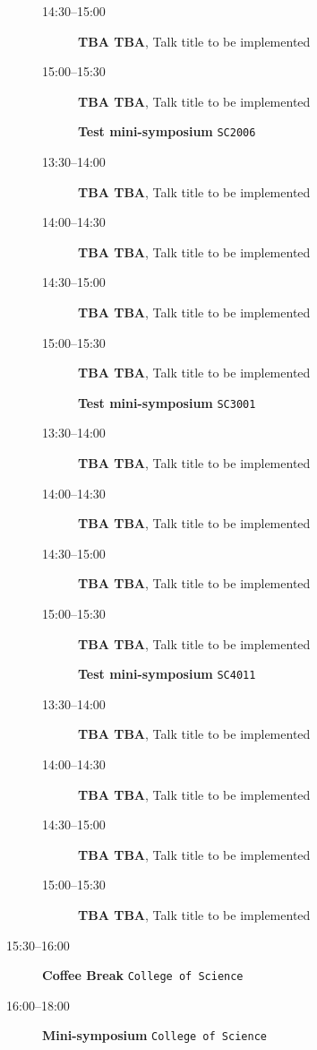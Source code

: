 \documentclass[ILAS2025-program.tex]{subfiles}
\begin{document}
\begin{description}
\begin{description}
        \item[14:30--15:00] \textbf{TBA TBA}, Talk title to be implemented
        \item[15:00--15:30] \textbf{TBA TBA}, Talk title to be implemented
        \end{description}
    \begin{description}
    \item[] \textbf{Test mini-symposium} {\footnotesize\texttt{SC2006}}
    \item[13:30--14:00] \textbf{TBA TBA}, Talk title to be implemented
        \item[14:00--14:30] \textbf{TBA TBA}, Talk title to be implemented
        \item[14:30--15:00] \textbf{TBA TBA}, Talk title to be implemented
        \item[15:00--15:30] \textbf{TBA TBA}, Talk title to be implemented
        \end{description}
    \begin{description}
    \item[] \textbf{Test mini-symposium} {\footnotesize\texttt{SC3001}}
    \item[13:30--14:00] \textbf{TBA TBA}, Talk title to be implemented
        \item[14:00--14:30] \textbf{TBA TBA}, Talk title to be implemented
        \item[14:30--15:00] \textbf{TBA TBA}, Talk title to be implemented
        \item[15:00--15:30] \textbf{TBA TBA}, Talk title to be implemented
        \end{description}
    \begin{description}
    \item[] \textbf{Test mini-symposium} {\footnotesize\texttt{SC4011}}
    \item[13:30--14:00] \textbf{TBA TBA}, Talk title to be implemented
        \item[14:00--14:30] \textbf{TBA TBA}, Talk title to be implemented
        \item[14:30--15:00] \textbf{TBA TBA}, Talk title to be implemented
        \item[15:00--15:30] \textbf{TBA TBA}, Talk title to be implemented
        \end{description}
    \item[15:30--16:00] \textbf{Coffee Break} {\footnotesize\texttt{College of Science}}
    \item[16:00--18:00] \textbf{Mini-symposium} {\footnotesize\texttt{College of Science}}

\end{description}
\end{document}
